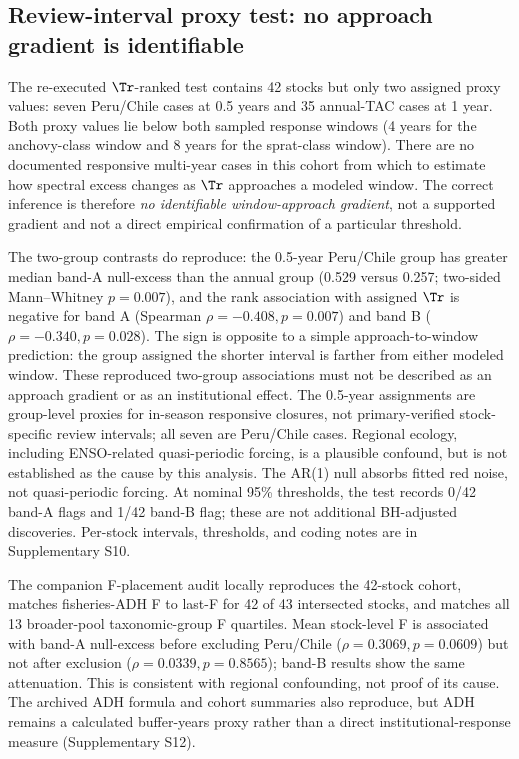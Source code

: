 \subsection{Review-interval proxy test: no approach gradient is identifiable}\label{sec:tr-results}

The re-executed \(\Tr\)-ranked test contains 42 stocks but only two assigned proxy values: seven Peru/Chile cases at 0.5 years and 35 annual-TAC cases at 1 year. Both proxy values lie below both sampled response windows (4 years for the anchovy-class window and 8 years for the sprat-class window). There are no documented responsive multi-year cases in this cohort from which to estimate how spectral excess changes as \(\Tr\) approaches a modeled window. The correct inference is therefore \emph{no identifiable window-approach gradient}, not a supported gradient and not a direct empirical confirmation of a particular threshold.

The two-group contrasts do reproduce: the 0.5-year Peru/Chile group has greater median band-A null-excess than the annual group (0.529 versus 0.257; two-sided Mann--Whitney \(p=0.007\)), and the rank association with assigned \(\Tr\) is negative for band A (Spearman \(\rho=-0.408, p=0.007\)) and band B (\(\rho=-0.340, p=0.028\)). The sign is opposite to a simple approach-to-window prediction: the group assigned the shorter interval is farther from either modeled window. These reproduced two-group associations must not be described as an approach gradient or as an institutional effect. The 0.5-year assignments are group-level proxies for in-season responsive closures, not primary-verified stock-specific review intervals; all seven are Peru/Chile cases. Regional ecology, including ENSO-related quasi-periodic forcing, is a plausible confound, but is not established as the cause by this analysis. The AR(1) null absorbs fitted red noise, not quasi-periodic forcing. At nominal 95\% thresholds, the test records 0/42 band-A flags and 1/42 band-B flag; these are not additional BH-adjusted discoveries. Per-stock intervals, thresholds, and coding notes are in Supplementary S10.

The companion F-placement audit locally reproduces the 42-stock cohort, matches fisheries-ADH F to last-F for 42 of 43 intersected stocks, and matches all 13 broader-pool taxonomic-group F quartiles. Mean stock-level F is associated with band-A null-excess before excluding Peru/Chile (\(\rho=0.3069,p=0.0609\)) but not after exclusion (\(\rho=0.0339,p=0.8565\)); band-B results show the same attenuation. This is consistent with regional confounding, not proof of its cause. The archived ADH formula and cohort summaries also reproduce, but ADH remains a calculated buffer-years proxy rather than a direct institutional-response measure (Supplementary S12).

